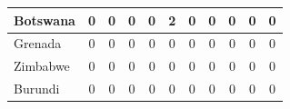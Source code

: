 \documentclass[12pt]{article}  %
\begin{document}
\begin{subappendices}
\begin{longtable}{|l|c|c|c|c|c|c|c|c|c|c|}
	\hline
	Botswana                                                       & 0                                                                      & 0                                                                      & 0                                                                      & 0                                                                      & 2                                                                      & 0                                                                      & 0                         & 0                           & 0                           & 0                           \\ 
	\hline
	Grenada                                                        & 0                                                                      & 0                                                                      & 0                                                                      & 0                                                                      & 0                                                                      & 0                                                                      & 0                         & 0                           & 0                           & 0                           \\ 
	\hline
	Zimbabwe                                                       & 0                                                                      & 0                                                                      & 0                                                                      & 0                                                                      & 0                                                                      & 0                                                                      & 0                         & 0                           & 0                           & 0                           \\ 
	\hline
	Burundi                                                        & 0                                                                      & 0                                                                      & 0                                                                      & 0                                                                      & 0                                                                      & 0                                                                      & 0                         & 0                           & 0                           & 0                           \\ 

\end{longtable}
\end{subappendices}
\end{document}
